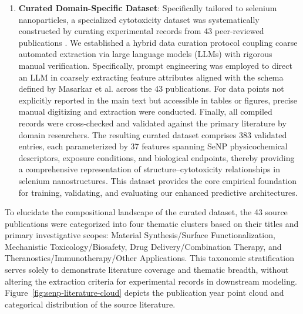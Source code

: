 \begin{enumerate}
  \item \textbf{Curated Domain-Specific Dataset}:
Specifically tailored to selenium nanoparticles, a specialized cytotoxicity dataset was systematically constructed by curating experimental records from 43 peer-reviewed publications \cite{chen_selenium_2008, li_reversal_2011, zheng_sialic_2011, liu_selenium_2012, wu_surface_2012, chen_surface_2012,
  yu_positive_2012, chen_peg-nanolized_2012, pi_pathway_2013, wu_induction_2013, feng_differential_2014,
  huang_selective_2013, li_functionalized_2013, zhang_enhancement_2013, jiang_gracilaria_2014, yu_ph-responsive_2014,
  zeng_construction_2015, liu_sequentially_2016, liu_facile_2016, yu_x-ray-responsive_2016, fu_rgd_2016,
  fang_targeting_2017, chen_efficient_2018, fang_dualtargeted_2018, huang_autophagy_2018, liu_highly_2018,
  wang_regulating_2016, hu_selenium_2019, zeng_potentiation_2019, huang_dual-targeting_2019, huang_highly_2019,
  zhang_systematic_2019, zheng_thermosensitive_2019, huang_chiralitydriven_2020,
  yang_lentinan-functionalized_2020, liu_rapid_2021, an_functionalized_2021, song_translational_2021,
  yang_atherosclerotic_2022, yang_functionalized_2021, liang_translational_2022, liu_specific_2022, du_highly_2022}.
We established a hybrid data curation protocol coupling coarse automated extraction via large language models (LLMs) with rigorous manual verification.
Specifically, prompt engineering was employed to direct an LLM in coarsely extracting feature attributes aligned with the schema defined by Masarkar et al. \cite{masarkar2024} across the 43 publications. For data points not explicitly reported in the main text but accessible in tables or figures, precise manual digitizing and extraction were conducted. Finally, all compiled records were cross-checked and validated against the primary literature by domain researchers.
The resulting curated dataset comprises 383 validated entries, each parameterized by 37 features spanning SeNP physicochemical descriptors, exposure conditions, and biological endpoints, thereby providing a comprehensive representation of structure--cytotoxicity relationships in selenium nanostructures.
This dataset provides the core empirical foundation for training, validating, and evaluating our enhanced predictive architectures.
\end{enumerate}

To elucidate the compositional landscape of the curated dataset, the 43 source publications were categorized into four thematic clusters based on their titles and primary investigative scopes: Material Synthesis/Surface Functionalization, Mechanistic Toxicology/Biosafety, Drug Delivery/Combination Therapy, and Theranostics/Immunotherapy/Other Applications. This taxonomic stratification serves solely to demonstrate literature coverage and thematic breadth, without altering the extraction criteria for experimental records in downstream modeling. Figure~\ref{fig:senp-literature-cloud} depicts the publication year point cloud and categorical distribution of the source literature.

